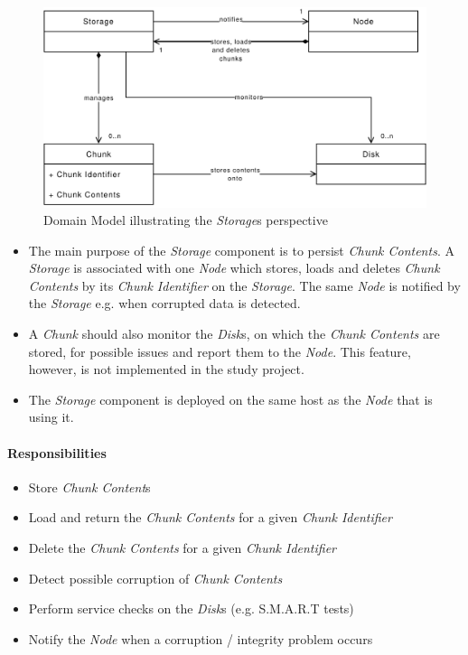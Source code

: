 \begin{figure}[h]
    \centering
    \includegraphics[width=1\linewidth]{resources/storage_domain_model}
    \caption[Storage Domain Model]{Domain Model illustrating the \emph{Storage}s perspective}
\end{figure}

\begin{itemize}
    \item The main purpose of the \emph{Storage} component is to persist \emph{Chunk Contents}. A \emph{Storage} is associated with one \emph{Node} which stores, loads and deletes \emph{Chunk Contents} by its \emph{Chunk Identifier} on the \emph{Storage}. The same \emph{Node} is notified by the \emph{Storage} e.g. when corrupted data is detected.
    \item A \emph{Chunk} should also monitor the \emph{Disk}s, on which the \emph{Chunk Contents} are stored, for possible issues and report them to the \emph{Node}. This feature, however, is not implemented in the study project.
    \item The \emph{Storage} component is deployed on the same host as the \emph{Node} that is using it.
\end{itemize}


\paragraph{Responsibilities}

\begin{itemize}
    \item Store \emph{Chunk Content}s
    \item Load and return the \emph{Chunk Contents} for a given \emph{Chunk Identifier}
    \item Delete the \emph{Chunk Contents} for a given \emph{Chunk Identifier}
    \item Detect possible corruption of \emph{Chunk Contents}
    \item Perform service checks on the \emph{Disk}s (e.g. S.M.A.R.T tests)
    \item Notify the \emph{Node} when a corruption / integrity problem occurs
\end{itemize}

